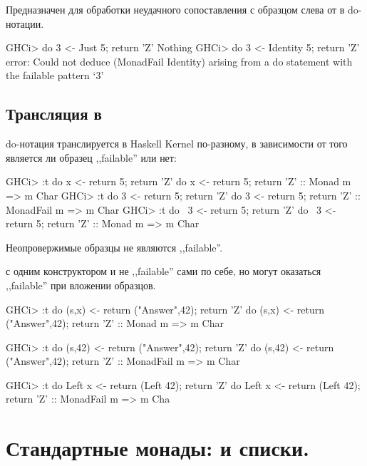 \documentclass[11pt,a4paper]{article}
\begin{document}
Предназначен для обработки неудачного сопоставления с образцом слева от \hs{<-} в do-нотации.
\begin{hscode}
GHCi> do {3 <- Just 5; return 'Z'}
Nothing
GHCi> do {3 <- Identity 5; return 'Z'} 
error: Could not deduce (MonadFail Identity) arising from a do statement with the failable pattern `3'
\end{hscode}
\subsection{Трансляция в }
do-нотация транслируется в Haskell Kernel по-разному, в
зависимости от того является ли образец ,,failable'' или нет:
\begin{hscode}
GHCi> :t do {x <- return 5; return 'Z'}
do {x <- return 5; return 'Z'} :: Monad m => m Char
GHCi> :t do {3 <- return 5; return 'Z'}
do {3 <- return 5; return 'Z'} :: MonadFail m => m Char
GHCi> :t do {~3 <- return 5; return 'Z'}
do {~3 <- return 5; return 'Z'} :: Monad m => m Char
\end{hscode}
Неопровержимые образцы не являются ,,failable''.

 с одним конструктором и  не ,,failable'' сами по себе, но могут оказаться ,,failable'' при вложении образцов.
\begin{hscode}
GHCi> :t do {(s,x) <- return ("Answer",42); return 'Z'}
do {(s,x) <- return ("Answer",42); return 'Z'} :: Monad m => m Char

GHCi> :t do {(s,42) <- return ("Answer",42); return 'Z'}
do {(s,42) <- return ("Answer",42); return 'Z'} :: MonadFail m => m Char

GHCi> :t do {Left x <- return (Left 42); return 'Z'}
do {Left x <- return (Left 42); return 'Z'} :: MonadFail m => m Cha
\end{hscode}


\section{Стандартные монады:  и списки.}
\end{document}
